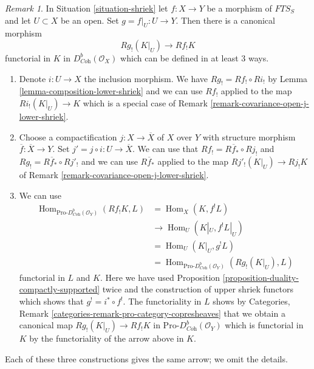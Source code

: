 \documentclass{stacks-project}
\theoremstyle{plain}
\theoremstyle{definition}
\theoremstyle{remark}
\newtheorem{remark}[subsection]{Remark}
\numberwithin{equation}{subsection}
\def\Hom{\mathop{\mathrm{Hom}}\nolimits}
\begin{document}
\begin{remark}
\label{remark-covariance-open-lower-shriek}
In Situation \ref{situation-shriek} let $f : X \to Y$ be a morphism of
$\textit{FTS}_S$ and let $U \subset X$ be an open. Set
$g = f|_U : U \to Y$. Then there is a canonical morphism
$$
Rg_!(K|_U) \longrightarrow Rf_!K
$$
functorial in $K$ in $D^b_{\textit{Coh}}(\mathcal{O}_X)$
which can be defined in at least 3 ways.
\begin{enumerate}
\item Denote $i : U \to X$ the inclusion morphism. We have
$Rg_! = Rf_! \circ Ri_!$ by
Lemma \ref{lemma-composition-lower-shriek}
and we can use $Rf_!$ applied to the map $Ri_!(K|_U) \to K$
which is a special case of
Remark \ref{remark-covariance-open-j-lower-shriek}.
\item Choose a compactification $j : X \to \overline{X}$
of $X$ over $Y$ with structure morphism $\overline{f} : \overline{X} \to Y$.
Set $j' = j \circ i : U \to \overline{X}$. We can
use that $Rf_! = R\overline{f}_* \circ Rj_!$ and
$Rg_! = R\overline{f}_* \circ Rj'_!$
and we can use $R\overline{f}_*$ applied to the map
$Rj'_!(K|_U) \to Rj_!K$ of
Remark \ref{remark-covariance-open-j-lower-shriek}.
\item We can use
\begin{align*}
\Hom_{\text{Pro-}D^b_{\textit{Coh}}(\mathcal{O}_Y)}(Rf_!K, L)
& =
\Hom_X(K, f^!L) \\
& \to
\Hom_U(K|_U, f^!L|_U) \\
& =
\Hom_U(K|_U, g^!L) \\
& =
\Hom_{\text{Pro-}D^b_{\textit{Coh}}(\mathcal{O}_Y)}(Rg_!(K|_U), L)
\end{align*}
functorial in $L$ and $K$. Here we have used
Proposition \ref{proposition-duality-compactly-supported}
twice and the construction of upper shriek functors which
shows that $g^! = i^* \circ f^!$. The functoriality in $L$ shows by
Categories, Remark \ref{categories-remark-pro-category-copresheaves}
that we obtain a canonical map $Rg_!(K|_U) \to Rf_!K$ in
$\text{Pro-}D^b_{\textit{Coh}}(\mathcal{O}_Y)$ which is
functorial in $K$ by the functoriality of the arrow above in $K$.
\end{enumerate}
Each of these three constructions gives the same arrow; we omit the
details.
\end{remark}
\end{document}
